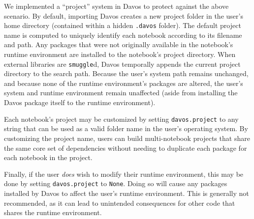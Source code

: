 \documentclass[preprint,12pt,a4paper]{elsarticle}
\begin{document}

We implemented a ``project'' system in Davos to protect against the
above scenario. By default, importing Davos creates a new project
folder in the user's home directory (contained within a hidden \texttt{.davos}
folder). The default project name is computed to uniquely identify each
notebook according to its filename and path. Any packages that were not
originally available in the notebook's runtime environment are installed to the
notebook's project directory. When external libraries are \texttt{smuggle}d,
Davos temporally appends the current project directory to the search
path. Because the user's system path remains unchanged, and because none of the
runtime environment's packages are altered, the user's system and runtime
environment remain unaffected (aside from installing the Davos package
itself to the runtime environment).

Each notebook's project may be customized by setting \texttt{davos.project} to
any string that can be used as a valid folder name in the user's operating
system. By customizing the project name, users can build multi-notebook
projects that share the same core set of dependencies without needing to
duplicate each package for each notebook in the project.

Finally, if the user \textit{does} wish to modify their runtime environment,
this may be done by setting \texttt{davos.project} to \texttt{None}. Doing so
will cause any packages installed by Davos to affect the user's
runtime environment.  This is generally not recommended, as it can lead to
unintended consequences for other code that shares the runtime environment.
\end{document}
